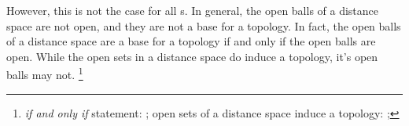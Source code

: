 However, this is not the case for all s. 
In general, the open balls of a distance space are not open, and they are not a base for a topology.
In fact, the open balls of a distance space are a base for a topology if and only if the open balls are open.
While the open sets in a distance space do 
induce a topology, it's open balls may not.%
\footnote{
  \emph{if and only if} statement: ;
  open sets of a distance space induce a topology: ;
  }
